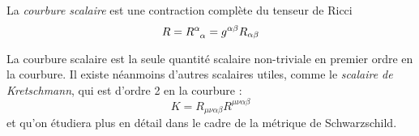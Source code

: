 \begin{theoremframe}
    \begin{defi}
        La \emph{courbure scalaire} est une contraction complète du tenseur de Ricci 
        \begin{equation}
            R = R\indices{^{\alpha}_{\alpha}} = g^{\alpha \beta }R_{\alpha \beta}
        \end{equation}
    \end{defi}
\end{theoremframe}
La courbure scalaire est la seule quantité scalaire non-triviale en premier ordre en la courbure. Il existe néanmoins d'autres scalaires utiles, comme le \emph{scalaire de Kretschmann}, qui est d'ordre 2 en la courbure :
\begin{equation}
    K = R_{\mu\nu \alpha\beta} R^{\mu\nu\alpha\beta}
\end{equation}
et qu'on étudiera plus en détail dans le cadre de la métrique de Schwarzschild.

